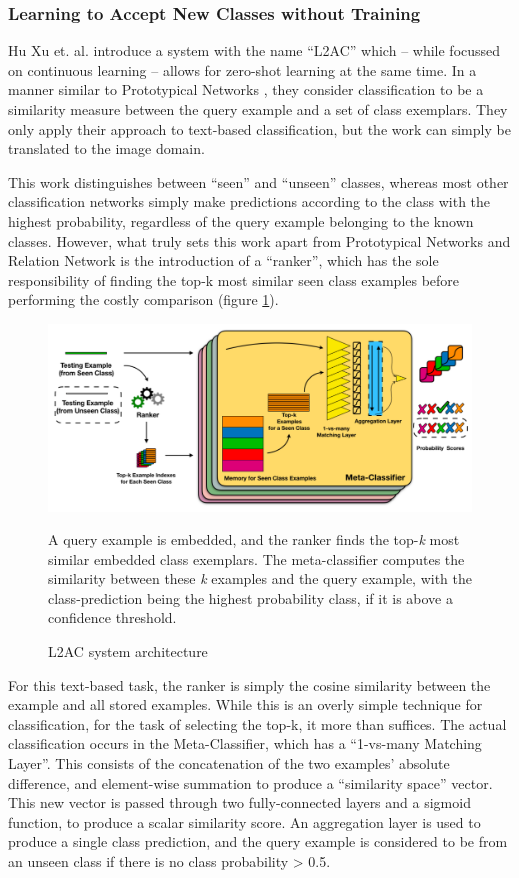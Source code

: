 \documentclass{report}
\begin{document}
\subsubsection{Learning to Accept New Classes without Training}
Hu Xu et. al. \parencite{l2ac} introduce a system with the name ``L2AC'' which -- while focussed on continuous learning -- allows for zero-shot learning at the same time. In a manner similar to Prototypical Networks \parencite{prototypical}, they consider classification to be a similarity measure between the query example and a set of class exemplars. They only apply their approach to text-based classification, but the work can simply be translated to the image domain. \par
This work distinguishes between ``seen'' and ``unseen'' classes, whereas most other classification networks simply make predictions according to the class with the highest probability, regardless of the query example belonging to the known classes. However, what truly sets this work apart from Prototypical Networks and Relation Network \parencite{relationnet} is the introduction of a ``ranker'', which has the sole responsibility of finding the top-k most similar seen class examples before performing the costly comparison (figure \ref{fig:l2ac:1}). \par
\begin{figure}[h]
	\centering
	\includegraphics[width=14cm]{l2ac}
	\caption{L2AC system architecture}
	A query example is embedded, and the ranker finds the top-\textit{k} most similar embedded class exemplars. The meta-classifier computes the similarity between these \textit{k} examples and the query example, with the class-prediction being the highest probability class, if it is above a confidence threshold.
	\label{fig:l2ac:1}
\end{figure}
For this text-based task, the ranker is simply the cosine similarity between the example and all stored examples. While this is an overly simple technique for classification, for the task of selecting the top-k, it more than suffices. The actual classification occurs in the Meta-Classifier, which has a ``1-vs-many Matching Layer''. This consists of the concatenation of the two examples' absolute difference, and element-wise summation to produce a ``similarity space'' vector. This new vector is passed through two fully-connected layers and a sigmoid function, to produce a scalar similarity score. An aggregation layer is used to produce a single class prediction, and the query example is considered to be from an unseen class if there is no class probability > 0.5. \par
\end{document}
